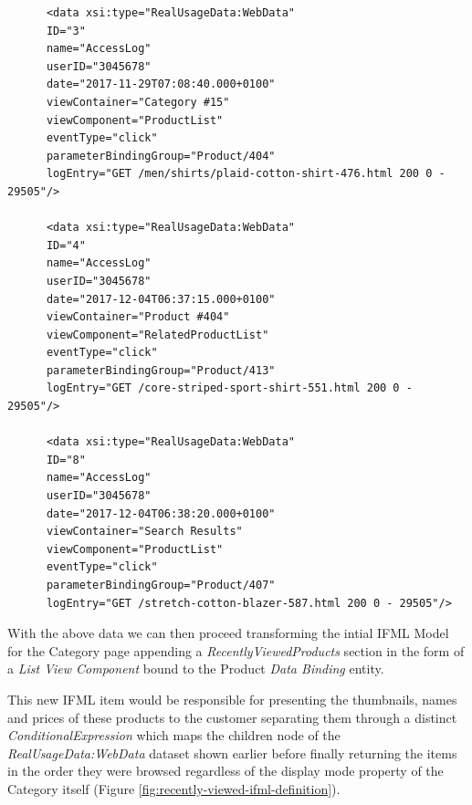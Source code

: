 \vspace{0.5cm}
\lstset{language=XML}
\begin{lstlisting} 
      <data xsi:type="RealUsageData:WebData"
      ID="3"
      name="AccessLog"
      userID="3045678"
      date="2017-11-29T07:08:40.000+0100"
      viewContainer="Category #15"
      viewComponent="ProductList"
      eventType="click"
      parameterBindingGroup="Product/404"
      logEntry="GET /men/shirts/plaid-cotton-shirt-476.html 200 0 - 29505"/>
      
      <data xsi:type="RealUsageData:WebData"
      ID="4"
      name="AccessLog"
      userID="3045678"
      date="2017-12-04T06:37:15.000+0100"
      viewContainer="Product #404"
      viewComponent="RelatedProductList"
      eventType="click"
      parameterBindingGroup="Product/413"
      logEntry="GET /core-striped-sport-shirt-551.html 200 0 - 29505"/>

      <data xsi:type="RealUsageData:WebData"
      ID="8"
      name="AccessLog"
      userID="3045678"
      date="2017-12-04T06:38:20.000+0100"
      viewContainer="Search Results"
      viewComponent="ProductList"
      eventType="click"
      parameterBindingGroup="Product/407"
      logEntry="GET /stretch-cotton-blazer-587.html 200 0 - 29505"/>
\end{lstlisting}
\vspace{0.5cm}

With the above data we can then proceed transforming the intial IFML Model for the Category page appending a \textit{RecentlyViewedProducts} section in the form of a \textit{List View Component} bound to the Product \textit{Data Binding} entity.

This new IFML item would be responsible for presenting the thumbnails, names and prices of these products to the customer separating them through a distinct \textit{ConditionalExpression} which maps the children node of the \textit{RealUsageData:WebData} dataset shown earlier before finally returning the items in the order they were browsed regardless of the display mode property of the Category itself (Figure \ref{fig:recently-viewed-ifml-definition}).

